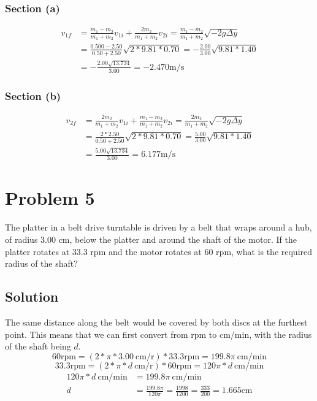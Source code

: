 \documentclass[12pt]{article}
\begin{document}
\subsubsection*{Section (a)}
\begin{align*}
    v_{1f}  &=  \frac{m_1 - m_2}{m_1 + m_2}v_{1i} + \frac{2 m_2}{m_1 + m_2}v_{2i}
        =   \frac{m_1 - m_2}{m_1 + m_2}\sqrt{-2g\Delta y}\\
        &=  \frac{0.500 - 2.50}{0.50 + 2.50}\sqrt{2*9.81*0.70}
        =   -\frac{2.00}{3.00}\sqrt{9.81*1.40}\\
        &=  -\frac{2.00\sqrt{13.734}}{3.00}
        =   \boxed{-2.470\unit{\meter/\second}}
\end{align*}

\subsubsection*{Section (b)}
\begin{align*}
    v_{2f}  &=  \frac{2 m_2}{m_1 + m_2}v_{1i} + \frac{m_1 - m_2}{m_1 + m_2}v_{2i}
        =   \frac{2 m_2}{m_1 + m_2}\sqrt{-2g\Delta y}\\
        &=  \frac{2*2.50}{0.50 + 2.50}\sqrt{2*9.81*0.70}
        =   \frac{5.00}{3.00}\sqrt{9.81*1.40}\\
        &=  \frac{5.00\sqrt{13.734}}{3.00}
        =   \boxed{6.177\unit{\meter/\second}}
\end{align*}

\pagebreak
\section*{Problem 5}
The platter in a belt drive turntable is driven by a belt that wraps around a hub, of radius 3.00
cm, below the platter and around the shaft of the motor. If the platter rotates at 33.3 rpm and the
motor rotates at 60 rpm, what is the required radius of the shaft?

\subsection*{Solution}
The same distance along the belt would be covered by both discs at the furthest point. This means that we can first convert from rpm to cm/min, with the radius of the shaft being $d$.
\[
    60 \text{rpm} = (2*\pi*3.00\ \text{cm/r}) * 33.3 \text{rpm} = 199.8 \pi\ \text{cm/min}
\]
\[
    33.3 \text{rpm} = (2*\pi*d\ \text{cm/r}) * 60 \text{rpm} = 120 \pi * d\ \text{cm/min}
\]
\begin{align*}
    120 \pi * d\ \text{cm/min}  &=  199.8 \pi\ \text{cm/min}\\
    d   &=  \frac{199.8 \pi}{120 \pi}
        =   \frac{1998}{1200}
        =   \frac{333}{200}
        =   \boxed{1.665 \unit{\centi\meter}}
\end{align*}
\end{document}
